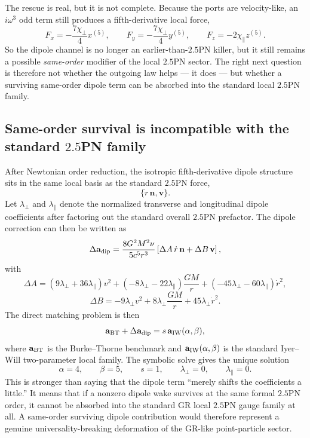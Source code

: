 \documentclass[11pt]{article}
\begin{document}
The rescue is real, but it is not complete.  Because the ports are velocity-like,
an $i\omega^3$ odd term still produces a fifth-derivative local force,
\[
F_x=-\frac{7\chi_\perp}{4}x^{(5)},
\qquad
F_y=-\frac{7\chi_\perp}{4}y^{(5)},
\qquad
F_z=-2\chi_\parallel z^{(5)}.
\]
So the dipole channel is no longer an earlier-than-$2.5$PN killer, but it still
remains a possible \emph{same-order} modifier of the local $2.5$PN sector.  The
right next question is therefore not whether the outgoing law helps --- it does
--- but whether a surviving same-order dipole term can be absorbed into the
standard local $2.5$PN family.

\subsection{Same-order survival is incompatible with the standard \texorpdfstring{$2.5$}{2.5}PN family}
\label{sec:dipole-audit-matching}

After Newtonian order reduction, the isotropic fifth-derivative dipole structure
sits in the same local basis as the standard $2.5$PN force,
\[
\{\dot r\,\mathbf n,\mathbf v\}.
\]
Let $\lambda_\perp$ and $\lambda_\parallel$ denote the normalized transverse and
longitudinal dipole coefficients after factoring out the standard overall
$2.5$PN prefactor.  The dipole correction can then be written as
\[
\Delta\mathbf a_{\rm dip}
=
\frac{8G^2M^2\nu}{5c^5r^3}
\left[
\Delta A\,\dot r\,\mathbf n+\Delta B\,\mathbf v
\right],
\]
with
\[
\Delta A=
(9\lambda_\perp+36\lambda_\parallel)v^2
+(-8\lambda_\perp-22\lambda_\parallel)\frac{GM}{r}
+(-45\lambda_\perp-60\lambda_\parallel)\dot r^2,
\]
\[
\Delta B=
-9\lambda_\perp v^2
+8\lambda_\perp\frac{GM}{r}
+45\lambda_\perp\dot r^2.
\]
The direct matching problem is then
\[
\mathbf a_{\rm BT}+\Delta\mathbf a_{\rm dip}
=
 s\,\mathbf a_{\rm IW}(\alpha,\beta),
\]
where \(\mathbf a_{\rm BT}\) is the Burke--Thorne benchmark and
\(\mathbf a_{\rm IW}(\alpha,\beta)\) is the standard Iyer--Will two-parameter
local family.  The symbolic solve gives the unique solution
\[
\boxed{
\alpha=4,
\qquad
\beta=5,
\qquad
s=1,
\qquad
\lambda_\perp=0,
\qquad
\lambda_\parallel=0.
}
\]
This is stronger than saying that the dipole term ``merely shifts the
coefficients a little.''  It means that if a nonzero dipole wake survives at the
same formal $2.5$PN order, it cannot be absorbed into the standard GR local
$2.5$PN gauge family at all.  A same-order surviving dipole contribution would
therefore represent a genuine universality-breaking deformation of the GR-like
point-particle sector.
\end{document}
